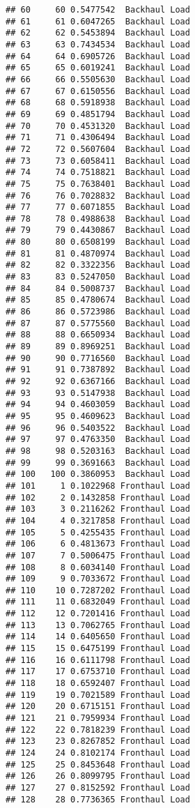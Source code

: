\documentclass[
]{article}
\begin{document}
\begin{verbatim}
## 60     60 0.5477542  Backhaul Load
## 61     61 0.6047265  Backhaul Load
## 62     62 0.5453894  Backhaul Load
## 63     63 0.7434534  Backhaul Load
## 64     64 0.6905726  Backhaul Load
## 65     65 0.6019241  Backhaul Load
## 66     66 0.5505630  Backhaul Load
## 67     67 0.6150556  Backhaul Load
## 68     68 0.5918938  Backhaul Load
## 69     69 0.4851794  Backhaul Load
## 70     70 0.4531320  Backhaul Load
## 71     71 0.4306494  Backhaul Load
## 72     72 0.5607604  Backhaul Load
## 73     73 0.6058411  Backhaul Load
## 74     74 0.7518821  Backhaul Load
## 75     75 0.7638401  Backhaul Load
## 76     76 0.7028832  Backhaul Load
## 77     77 0.6071855  Backhaul Load
## 78     78 0.4988638  Backhaul Load
## 79     79 0.4430867  Backhaul Load
## 80     80 0.6508199  Backhaul Load
## 81     81 0.4870974  Backhaul Load
## 82     82 0.3322356  Backhaul Load
## 83     83 0.5247050  Backhaul Load
## 84     84 0.5008737  Backhaul Load
## 85     85 0.4780674  Backhaul Load
## 86     86 0.5723986  Backhaul Load
## 87     87 0.5775560  Backhaul Load
## 88     88 0.6650934  Backhaul Load
## 89     89 0.8969251  Backhaul Load
## 90     90 0.7716560  Backhaul Load
## 91     91 0.7387892  Backhaul Load
## 92     92 0.6367166  Backhaul Load
## 93     93 0.5147938  Backhaul Load
## 94     94 0.4603059  Backhaul Load
## 95     95 0.4609623  Backhaul Load
## 96     96 0.5403522  Backhaul Load
## 97     97 0.4763350  Backhaul Load
## 98     98 0.5203163  Backhaul Load
## 99     99 0.3691663  Backhaul Load
## 100   100 0.3860953  Backhaul Load
## 101     1 0.1022968 Fronthaul Load
## 102     2 0.1432858 Fronthaul Load
## 103     3 0.2116262 Fronthaul Load
## 104     4 0.3217858 Fronthaul Load
## 105     5 0.4255435 Fronthaul Load
## 106     6 0.4813673 Fronthaul Load
## 107     7 0.5006475 Fronthaul Load
## 108     8 0.6034140 Fronthaul Load
## 109     9 0.7033672 Fronthaul Load
## 110    10 0.7287202 Fronthaul Load
## 111    11 0.6832049 Fronthaul Load
## 112    12 0.7201416 Fronthaul Load
## 113    13 0.7062765 Fronthaul Load
## 114    14 0.6405650 Fronthaul Load
## 115    15 0.6475199 Fronthaul Load
## 116    16 0.6111798 Fronthaul Load
## 117    17 0.6753710 Fronthaul Load
## 118    18 0.6592407 Fronthaul Load
## 119    19 0.7021589 Fronthaul Load
## 120    20 0.6715151 Fronthaul Load
## 121    21 0.7959934 Fronthaul Load
## 122    22 0.7818239 Fronthaul Load
## 123    23 0.8267852 Fronthaul Load
## 124    24 0.8102174 Fronthaul Load
## 125    25 0.8453648 Fronthaul Load
## 126    26 0.8099795 Fronthaul Load
## 127    27 0.8152592 Fronthaul Load
## 128    28 0.7736365 Fronthaul Load

\end{verbatim}
\end{document}
